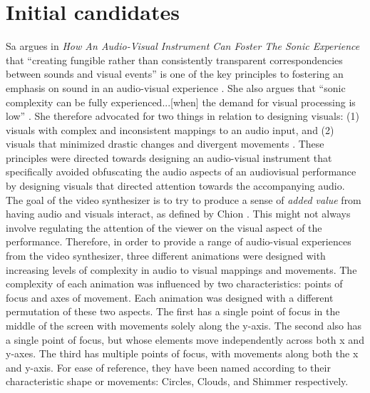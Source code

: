 \documentclass[../initial_thesis.tex]{subfiles}
\begin{document}
\section{Initial candidates} \label{sec:initialcandidates}
Sa argues in \textit{How An Audio-Visual Instrument Can Foster The Sonic Experience} that ``creating fungible rather than consistently transparent correspondencies between sounds and visual events'' is one of the key principles to fostering an emphasis on sound in an audio-visual experience \cite{Sa2013}. She also argues that ``sonic complexity can be fully experienced...[when] the demand for visual processing is low'' \cite{Sa2013}. She therefore advocated for two things in relation to designing visuals: (1) visuals with complex and inconsistent mappings to an audio input, and (2) visuals that minimized drastic changes and divergent movements \cite{Sa2013}. These principles were directed towards designing an audio-visual instrument that specifically avoided obfuscating the audio aspects of an audiovisual performance by designing visuals that directed attention towards the accompanying audio. The goal of the video synthesizer is to try to produce a sense of \emph{added value} from having audio and visuals interact, as defined by Chion \cite{Chion1994}. This might not always involve regulating the attention of the viewer on the visual aspect of the performance. Therefore, in order to provide a range of audio-visual experiences from the video synthesizer, three different animations were designed with increasing levels of complexity in audio to visual mappings and movements. The complexity of each animation was influenced by two characteristics: points of focus and axes of movement. Each animation was designed with a different permutation of these two aspects. The first has a single point of focus in the middle of the screen with movements solely along the y-axis. The second also has a single point of focus, but whose elements move independently across both x and y-axes. The third has multiple points of focus, with movements along both the x and y-axis. For ease of reference, they have been named according to their characteristic shape or movements: Circles, Clouds, and Shimmer respectively.
\end{document}
